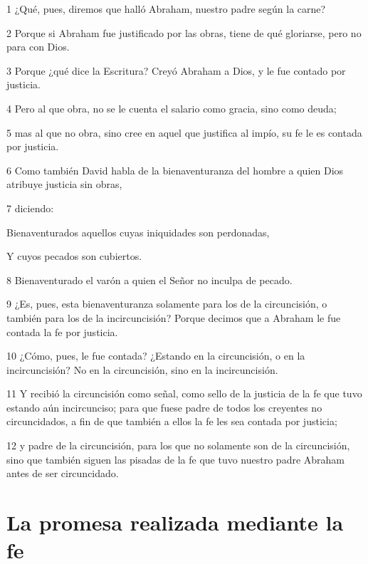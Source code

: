 \par 1 ¿Qué, pues, diremos que halló Abraham, nuestro padre según la carne?
\par 2 Porque si Abraham fue justificado por las obras, tiene de qué gloriarse, pero no para con Dios.
\par 3 Porque ¿qué dice la Escritura? Creyó Abraham a Dios, y le fue contado por justicia.
\par 4 Pero al que obra, no se le cuenta el salario como gracia, sino como deuda;
\par 5 mas al que no obra, sino cree en aquel que justifica al impío, su fe le es contada por justicia.
\par 6 Como también David habla de la bienaventuranza del hombre a quien Dios atribuye justicia sin obras,
\par 7 diciendo:
\par Bienaventurados aquellos cuyas iniquidades son perdonadas,
\par Y cuyos pecados son cubiertos.
\par 8 Bienaventurado el varón a quien el Señor no inculpa de pecado.
\par 9 ¿Es, pues, esta bienaventuranza solamente para los de la circuncisión, o también para los de la incircuncisión? Porque decimos que a Abraham le fue contada la fe por justicia.
\par 10 ¿Cómo, pues, le fue contada? ¿Estando en la circuncisión, o en la incircuncisión? No en la circuncisión, sino en la incircuncisión.
\par 11 Y recibió la circuncisión como señal, como sello de la justicia de la fe que tuvo estando aún incircunciso; para que fuese padre de todos los creyentes no circuncidados, a fin de que también a ellos la fe les sea contada por justicia;
\par 12 y padre de la circuncisión, para los que no solamente son de la circuncisión, sino que también siguen las pisadas de la fe que tuvo nuestro padre Abraham antes de ser circuncidado.

\section*{La promesa realizada mediante la fe}

